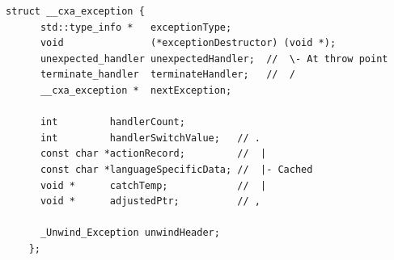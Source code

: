 \newsavebox{\LSTcxaexception}
\begin{lrbox}{\LSTcxaexception}
  \begin{lstlisting}[style=c++,basicstyle={\ttfamily\footnotesize},linewidth=0.8\textwidth]
    struct __cxa_exception {
      std::type_info *	 exceptionType;
      void               (*exceptionDestructor) (void *);
      unexpected_handler unexpectedHandler;  //  \- At throw point
      terminate_handler	 terminateHandler;   //  /
      __cxa_exception *	 nextException;

      int         handlerCount;
      int         handlerSwitchValue;   // .
      const char *actionRecord;         //  |
      const char *languageSpecificData; //  |- Cached
      void *      catchTemp;            //  |
      void *      adjustedPtr;          // ,

      _Unwind_Exception	unwindHeader;
    };
  \end{lstlisting}
\end{lrbox}
